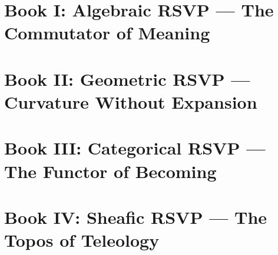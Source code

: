 



\frontmatter
\maketitle
\tableofcontents

\mainmatter

\part{Book I: Algebraic RSVP — The Commutator of Meaning}


\part{Book II: Geometric RSVP — Curvature Without Expansion}


\part{Book III: Categorical RSVP — The Functor of Becoming}


\part{Book IV: Sheafic RSVP — The Topos of Teleology}


\appendix




